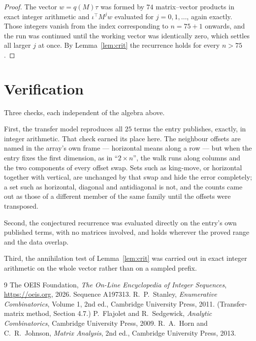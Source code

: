 \documentclass[11pt,a4paper]{article}
\theoremstyle{plain}
\theoremstyle{definition}
\begin{document}
\begin{proof}
The vector $w=q(M)\tau$ was formed by $74$ matrix--vector products in exact integer
arithmetic and $\iota^{\!\top}M^{j}w$ evaluated for $j=0,1,\dots$, again exactly. Those
integers vanish from the index corresponding to $n=75+1$ onwards, and the run was
continued until the working vector was identically zero, which settles all larger $j$ at once.
By Lemma~\ref{lem:crit} the recurrence holds for every $n>75$.
\end{proof}

\section{Verification}

Three checks, each independent of the algebra above.

First, the transfer model reproduces all $25$ terms the entry publishes, exactly, in
integer arithmetic. That check earned its place here. The neighbour offsets are named in the
array's own frame --- horizontal means along a row --- but when the entry fixes the first
dimension, as in ``$2\times n$'', the walk runs along columns and the two components of every
offset swap. Sets such as king-move, or horizontal together with vertical, are unchanged by
that swap and hide the error completely; a set such as horizontal, diagonal and antidiagonal
is not, and the counts came out as those of a different member of the same family until the
offsets were transposed.

Second, the conjectured recurrence was evaluated directly on the entry's own published terms,
with no matrices involved, and holds wherever the proved range and the data overlap.

Third, the annihilation test of Lemma~\ref{lem:crit} was carried out in exact integer
arithmetic on the whole vector rather than on a sampled prefix.

\begin{thebibliography}{9}
 The OEIS Foundation, \emph{The On-Line Encyclopedia of Integer
Sequences}, \url{https://oeis.org}, 2026. Sequence A197313.
 R.~P.~Stanley, \emph{Enumerative Combinatorics}, Volume 1, 2nd ed.,
Cambridge University Press, 2011. (Transfer-matrix method, Section 4.7.)
 P.~Flajolet and R.~Sedgewick, \emph{Analytic Combinatorics}, Cambridge
University Press, 2009.
 R.~A.~Horn and C.~R.~Johnson, \emph{Matrix Analysis}, 2nd ed., Cambridge
University Press, 2013.
\end{thebibliography}
\end{document}
